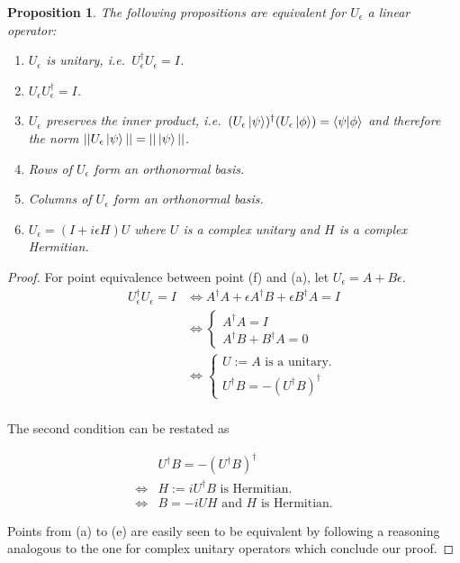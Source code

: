 \documentclass{article}
\newtheorem{proposition}[theorem]{Proposition}
\newcommand{\e}{\epsilon}
\begin{document}
\begin{proposition}\label{pr:unitary}
The following propositions are equivalent for $U_\e$ a linear operator:

\begin{enumerate}
 \item[a] $U_\e$ is unitary, i.e.\ $U_\e^\dagger U_\e = I$.
 \item[b] $U_\e U_\e^\dagger = I$.
 \item[c] $U_\e$ preserves the inner product, i.e.\ $(U_\e \ket\psi)^\dagger (U_\e \ket\phi) = \braket{\psi|\phi}$ and therefore the norm $||U_\e \ket\psi|| = ||\ket\psi||$.
 \item[d] Rows of $U_\e$ form an orthonormal basis.
 \item[e] Columns of $U_\e$ form an orthonormal basis.
 \item[f] $U_\e = (I + i \e H)U$ where $U$ is a complex unitary and $H$ is a complex Hermitian.
\end{enumerate}
\end{proposition}
\begin{proof}
 For point equivalence between point (f) and (a), let $U_\e = A + B\e$.
\begin{equation}
 \begin{split}
  U_\e^\dagger U_\e = I &\iff A^\dagger A + \e A^\dagger B + \e B^\dagger A = I\\
                        &\iff \begin{cases}
      A^\dagger A = I \\
      A^\dagger B + B^\dagger A = 0
   \end{cases}\\
                        &\iff \begin{cases}
      U := A \text{ is a unitary.} \\
      U^\dagger B = - (U^\dagger B)^\dagger
   \end{cases}\\
 \end{split}
\end{equation}

The second condition can be restated as

\begin{equation}
 \begin{split}
      &U^\dagger B = - (U^\dagger B)^\dagger\\
      \iff &H := i U^\dagger B  \text{ is Hermitian.}\\
      \iff &B = -iUH \text{ and } H \text{ is Hermitian.}
 \end{split}
\end{equation}

Points from (a) to (e) are easily seen to be equivalent by following a reasoning analogous to the one for complex unitary operators which conclude our proof.

\end{proof}
\end{document}
